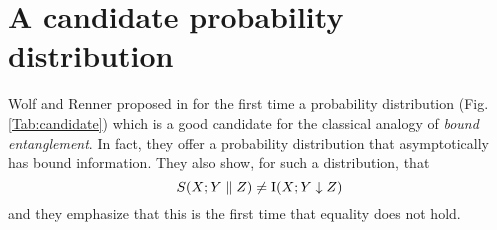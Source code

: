 \section{A candidate probability distribution}
    Wolf and Renner proposed in \cite{RW03} for the first time a probability distribution (Fig. \ref{Tab:candidate}) which is a good candidate for the classical analogy of \emph{bound entanglement}. 
    In fact, they offer a probability distribution that asymptotically has bound information. 
    They also show, for such a distribution, that 
    \begin{equation}
    	S(X;Y\parallel Z) \neq \operatorname{I}(X;Y\downarrow Z)
    \end{equation}  
     and they emphasize that this is the first time that equality does not hold.\\
     
